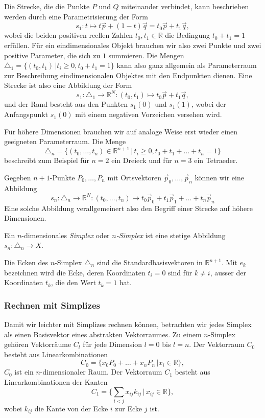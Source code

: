 Die Strecke, die die Punkte $P$ und $Q$ miteinander verbindet,
kann beschrieben werden durch eine Parametrisierung
der Form
\begin{equation}
s_1
\colon
t
\mapsto
t\vec{p} + (1-t) \vec{q}
=
t_0 \vec{p} + t_1\vec{q},
\end{equation}
wobei die beiden positiven reellen Zahlen $t_0,t_1\in\mathbb{R}$ die
Bedingung $t_0 + t_1 = 1$ erfüllen.
Für ein eindimensionales Objekt brauchen wir also zwei Punkte und zwei
positive Parameter, die sich zu $1$ summieren.
Die Mengen $\triangle_1=\{ (t_0,t_1)\,|t_i\ge 0, t_0+t_1=1\}$ kann also
ganz allgemein als Parameterraum zur Beschreibung eindimensionalen Objektes
mit den Endpunkten dienen.
Eine Strecke ist also eine Abbildung der Form
\begin{equation}
s_1
\colon
\triangle_1 \to \mathbb{R}^N
:
(t_0,t_1)
\mapsto
t_0 \vec{p} + t_1\vec{q},
\end{equation}
und der Rand besteht aus den Punkten $s_1(0)$ und $s_1(1)$, wobei der
Anfangspunkt $s_1(0)$ mit einem negativen Vorzeichen versehen wird.

Für höhere Dimensionen brauchen wir auf analoge Weise erst wieder einen
geeigneten Parameterraum.
Die Menge
\[
\triangle_n
=
\{(t_0,\dots,t_n)\in\mathbb{R}^{n+1}\,|\, t_i\ge 0,t_0+t_1+\dots+t_n=1\}
\]
beschreibt zum Beispiel für $n=2$ ein Dreieck und für $n=3$ ein 
Tetraeder.

Gegeben $n+1$-Punkte $P_0,\dots,P_n$ mit Ortsvektoren
$\vec{p}_0,\dots,\vec{p}_n$ können wir eine Abbildung
\begin{equation}
s_n
\colon
\triangle_n
\to
\mathbb{R}^N
:
(t_0,\dots,t_n)
\mapsto
t_0\vec{p}_0
+
t_1\vec{p}_1
+
\dots
+
t_n\vec{p}_n
\end{equation}
Eine solche Abbildung verallgemeinert also den Begriff einer Strecke
auf höhere Dimensionen.

\begin{definition}
\label{buch:def:simplex}
Ein $n$-dimensionales {\em Simplex} oder {\em $n$-Simplex} ist eine
stetige Abbildung $s_n\colon\triangle_n\to X$.
\end{definition}

Die Ecken des $n$-Simplex $\triangle_n$ sind die Standardbasisvektoren
in $\mathbb{R}^{n+1}$.
Mit $e_k$ bezeichnen wird die Ecke, deren Koordinaten $t_i=0$ sind für 
$k\ne i$, ausser der Koordinaten $t_k$, die den Wert $t_k=1$ hat.

\subsubsection{Rechnen mit Simplizes}
Damit wir leichter mit Simplizes rechnen können, betrachten wir
jedes Simplex als einen Basisvektor eines abstrakten Vektorraumes.
Zu einem $n$-Simplex gehören Vektorräume $C_l$ für jede Dimension
$l=0$ bis $l=n$.
Der Vektorraum $C_0$ besteht aus Linearkombinationen
\[
C_0 
=
\{ x_0 P_0 + \dots + x_n P_n \,| x_i\in\mathbb{R} \},
\]
$C_0$ ist ein $n$-dimensionaler Raum.
Der Vektorraum $C_1$ besteht aus Linearkombinationen der Kanten
\[
C_1 
=
\biggl\{
\sum_{i<j}
x_{ij} k_{ij}
\,
\bigg|
\,
x_{ij}\in\mathbb{R}
\biggr\},
\]
wobei $k_{ij}$ die Kante von der Ecke $i$ zur Ecke $j$ ist.

